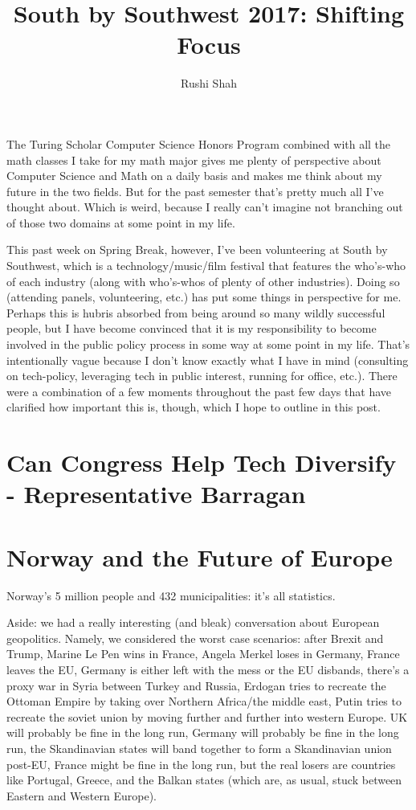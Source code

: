 \documentclass[12pt]{article}
\title{South by Southwest 2017: Shifting Focus}
\author{Rushi Shah}
\begin{document}
  \maketitle

      The Turing Scholar Computer Science Honors Program combined with all the math classes I take for my math major gives me plenty of perspective about Computer Science and Math on a daily basis and makes me think about my future in the two fields. But for the past semester that's pretty much all I've thought about. Which is weird, because I really can't imagine not branching out of those two domains at some point in my life. 

      This past week on Spring Break, however, I've been volunteering at South by Southwest, which is a technology/music/film festival that features the who's-who of each industry (along with who's-whos of plenty of other industries). Doing so (attending panels, volunteering, etc.) has put some things in perspective for me. Perhaps this is hubris absorbed from being around so many wildly successful people, but I have become convinced that it is my responsibility to become involved in the public policy process in some way at some point in my life. That's intentionally vague because I don't know exactly what I have in mind (consulting on tech-policy, leveraging tech in public interest, running for office, etc.). There were a combination of a few moments throughout the past few days that have clarified how important this is, though, which I hope to outline in this post. 

      \section{Can Congress Help Tech Diversify - Representative Barragan}

      \section{Norway and the Future of Europe}

        Norway's 5 million people and 432 municipalities: it's all statistics. 

        Aside: we had a really interesting (and bleak) conversation about European geopolitics. Namely, we considered the worst case scenarios: after Brexit and Trump, Marine Le Pen wins in France, Angela Merkel loses in Germany, France leaves the EU, Germany is either left with the mess or the EU disbands, there's a proxy war in Syria between Turkey and Russia, Erdogan tries to recreate the Ottoman Empire by taking over Northern Africa/the middle east, Putin tries to recreate the soviet union by moving further and further into western Europe. UK will probably be fine in the long run, Germany will probably be fine in the long run, the Skandinavian states will band together to form a Skandinavian union post-EU, France might be fine in the long run, but the real losers are countries like Portugal, Greece, and the Balkan states (which are, as usual, stuck between Eastern and Western Europe). 
\end{document}
